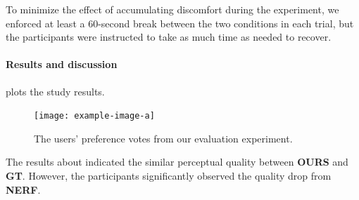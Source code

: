To minimize the effect of accumulating discomfort during the experiment, we enforced at least a 60-second break between the two conditions in each trial, but the participants were instructed to take as much time as needed to recover.



\paragraph{Results and discussion}
 plots the study results. 

\begin{figure}[htb]
    \centering
    \texttt{[image: example-image-a]}
    \caption{The users' preference votes from our evaluation experiment.}
    \label{fig:results:2afc}
\end{figure}


The results about indicated the similar perceptual quality between {\bf OURS} and {\bf GT}. However, the participants significantly observed the quality drop from {\bf NERF}. 

